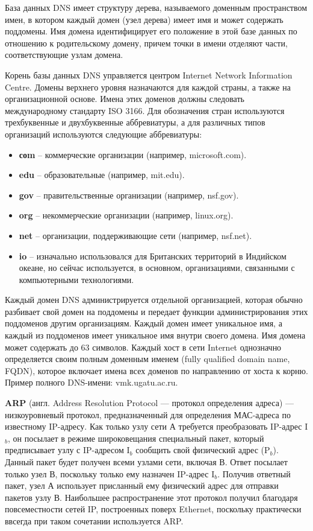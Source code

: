 \documentclass[a4paper]{article}
\begin{document}
	База данных DNS имеет структуру дерева, называемого доменным пространством имен, в котором каждый домен (узел дерева) имеет имя и может содержать поддомены. Имя домена идентифицирует его положение в этой базе данных по отношению к родительскому домену, причем точки в имени отделяют части, соответствующие узлам домена.
	
	Корень базы данных DNS управляется центром Internet Network Information Centre. Домены верхнего уровня назначаются для каждой страны, а также на организационной основе. Имена этих доменов должны следовать международному стандарту ISO 3166. Для обозначения стран используются трехбуквенные и двухбуквенные аббревиатуры, а для различных типов организаций используются следующие аббревиатуры: 
	
	\begin{itemize}
		\item \textbf{соm} -- коммерческие организации (например, microsoft.com).
		\item \textbf{edu} -- образовательные (например, mit.edu).
		\item \textbf{gov} -- правительственные организации (например, nsf.gov).
		\item \textbf{org} -- некоммерческие организации (например, linux.org).
		\item \textbf{net} -- организации, поддерживающие сети (например, nsf.net).
		\item \textbf{io} -- изначально использовался для Британских территорий в Индийском океане, но сейчас используется, в основном, организациями, связанными с компьютерными технологиями.
	\end{itemize}
	
	Каждый домен DNS администрируется отдельной организацией, которая обычно разбивает свой домен на поддомены и передает функции администрирования этих поддоменов другим организациям. Каждый домен имеет уникальное имя, а каждый из поддоменов имеет уникальное имя внутри своего домена. Имя домена может содержать до 63 символов. Каждый хост в сети Internet однозначно определяется своим полным доменным именем (fully qualified domain name, FQDN), которое включает имена всех доменов по направлению от хоста к корню. Пример полного DNS-имени: vmk.ugatu.ac.ru.
	
		\textbf{ARP} (англ. Address Resolution Protocol — протокол определения адреса) --- низкоуровневый протокол, предназначенный для определения МАС-адреса по известному IP-адресу. Как только узлу сети А требуется преобразовать IP-адрес I$_b$, он посылает в режиме широковещания специальный пакет, который предписывает узлу с IP-адресом I$_b$ сообщить свой физический адрес (P$_b$). Данный пакет будет получен всеми узлами сети, включая В. Ответ посылает только узел В, поскольку только ему назначен IP-адрес I$_b$. Получив ответный пакет, узел А использует присланный ему физический адрес для отправки пакетов узлу В. Наибольшее распространение этот протокол получил благодаря повсеместности сетей IP, построенных поверх Ethernet, поскольку практически ввсегда при таком сочетании используется ARP.
		
\end{document}
